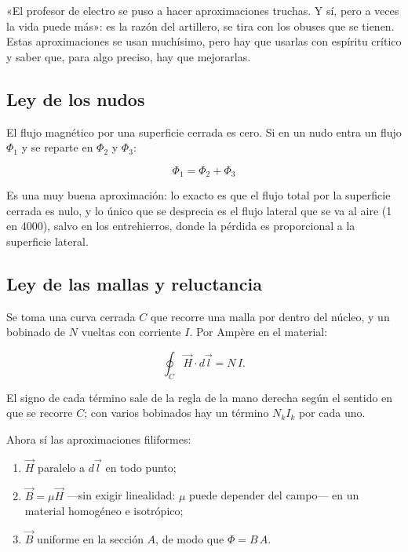 \documentclass[12pt,a4paper]{article}
\begin{document}
\begin{notebox}
«El profesor de electro se puso a hacer aproximaciones truchas. Y sí, pero a
veces la vida puede más»: es la razón del artillero, se tira con los obuses
que se tienen. Estas aproximaciones se usan muchísimo, pero hay que usarlas
con espíritu crítico y saber que, para algo preciso, hay que mejorarlas.
\end{notebox}

\subsection{Ley de los nudos}

El flujo magnético por una superficie cerrada es cero. Si en un nudo entra un
flujo $\Phi_1$ y se reparte en $\Phi_2$ y $\Phi_3$:

\begin{keybox}
\[
\boxed{\ \Phi_1 = \Phi_2 + \Phi_3\ }
\]
\end{keybox}

Es una muy buena aproximación: lo exacto es que el flujo total por la
superficie cerrada es nulo, y lo único que se desprecia es el flujo lateral que
se va al aire (1 en 4000), salvo en los entrehierros, donde la pérdida es
proporcional a la superficie lateral.

\subsection{Ley de las mallas y reluctancia}

Se toma una curva cerrada $C$ que recorre una malla por dentro del núcleo, y un
bobinado de $N$ vueltas con corriente $I$. Por Ampère en el material:

\[
\oint_C \vec H\cdot d\vec l = N\,I .
\]

El signo de cada término sale de la regla de la mano derecha según el sentido
en que se recorre $C$; con varios bobinados hay un término $N_k I_k$ por cada
uno.

Ahora sí las aproximaciones filiformes:

\begin{enumerate}
  \item $\vec H$ paralelo a $d\vec l$ en todo punto;
  \item $\vec B = \mu\vec H$ ---sin exigir linealidad: $\mu$ puede depender del campo---
  en un material homogéneo e isotrópico;
  \item $\vec B$ uniforme en la sección $A$, de modo que $\Phi = B\,A$.
\end{enumerate}
\end{document}
